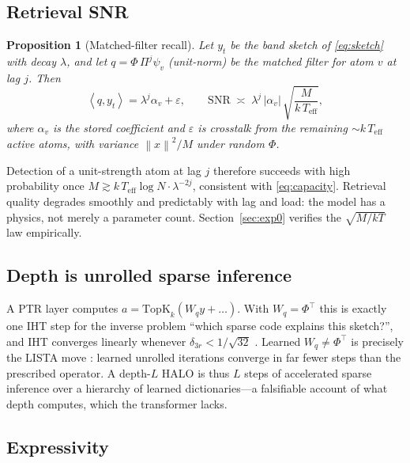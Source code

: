 \documentclass[11pt]{article}
\newtheorem{proposition}{Proposition}
\newcommand{\norm}[1]{\left\lVert #1 \right\rVert}
\newcommand{\inner}[2]{\left\langle #1, #2 \right\rangle}
\newcommand{\topk}{\mathrm{TopK}}
\begin{document}
\subsection{Retrieval SNR}
\label{sec:snr}

\begin{proposition}[Matched-filter recall]
\label{prop:snr}
Let $y_t$ be the band sketch of \eqref{eq:sketch} with decay $\lambda$, and let $q = \Phi\,\Pi^{j}\psi_v$ (unit-norm) be the matched filter for atom $v$ at lag $j$. Then
\begin{equation}
\inner{q}{y_t} = \lambda^{j}\alpha_v + \varepsilon, \qquad
\mathrm{SNR} \;\asymp\; \lambda^{j}\,\lvert\alpha_v\rvert\, \sqrt{\frac{M}{k\,T_{\mathrm{eff}}}} ,
\end{equation}
where $\alpha_v$ is the stored coefficient and $\varepsilon$ is crosstalk from the remaining $\sim k\,T_{\mathrm{eff}}$ active atoms, with variance $\norm{x}^2/M$ under random $\Phi$.
\end{proposition}

Detection of a unit-strength atom at lag $j$ therefore succeeds with high probability once $M \gtrsim k\,T_{\mathrm{eff}} \log N \cdot \lambda^{-2j}$, consistent with \eqref{eq:capacity}. Retrieval quality degrades smoothly and predictably with lag and load: the model has a physics, not merely a parameter count. Section~\ref{sec:exp0} verifies the $\sqrt{M/kT}$ law empirically.

\subsection{Depth is unrolled sparse inference}
\label{sec:iht}

A PTR layer computes $a = \topk_k(W_q y + \dots)$. With $W_q = \Phi^\top$ this is exactly one IHT step for the inverse problem ``which sparse code explains this sketch?'', and IHT converges linearly whenever $\delta_{3r} < 1/\sqrt{32}$ \citep{blumensath2009iterative}. Learned $W_q \neq \Phi^\top$ is precisely the LISTA move \citep{gregor2010learning}: learned unrolled iterations converge in far fewer steps than the prescribed operator. A depth-$L$ HALO is thus $L$ steps of accelerated sparse inference over a hierarchy of learned dictionaries---a falsifiable account of what depth computes, which the transformer lacks.

\subsection{Expressivity}
\end{document}
